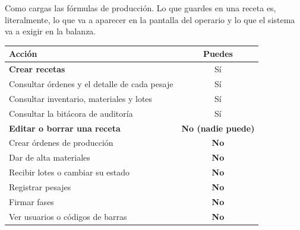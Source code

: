 

\tablaAcceso

\vspace{8pt}

\reglasAcceso


\avisoValidacion

\newpage
{}

Como \manualRol{} cargas las fórmulas de producción. Lo que guardes en una receta es,
literalmente, lo que va a aparecer en la pantalla del operario y lo que el sistema va
a exigir en la balanza.

\begin{center}
\begin{tabularx}{\linewidth}{@{}>{\raggedright\arraybackslash}X c@{}}
\toprule
\textbf{Acción} & \textbf{Puedes} \\
\midrule
\textbf{Crear recetas}                              & Sí \\
Consultar órdenes y el detalle de cada pesaje       & Sí \\
Consultar inventario, materiales y lotes            & Sí \\
Consultar la bitácora de auditoría                  & Sí \\
\midrule
\textbf{Editar o borrar una receta}                 & \textbf{No (nadie puede)} \\
Crear órdenes de producción                         & \textbf{No} \\
Dar de alta materiales                              & \textbf{No} \\
Recibir lotes o cambiar su estado                   & \textbf{No} \\
Registrar pesajes                                   & \textbf{No} \\
Firmar fases                                        & \textbf{No} \\
Ver usuarios o códigos de barras                    & \textbf{No} \\
\bottomrule
\end{tabularx}
\end{center}

